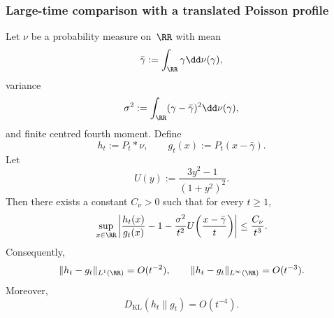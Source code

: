 \subsubsection{Large-time comparison with a translated Poisson profile}

\begin{proposition}%
\label{prop:poisson-second-order}
Let $\nu$ be a probability measure on~$\RR$ with mean
\[
\bar{\gamma}:=\int_{\RR}\gamma\dd\nu(\gamma),
\]
variance
\[
\sigma^{2}:=\int_{\RR}(\gamma-\bar{\gamma})^{2}\dd\nu(\gamma),
\]
and finite centred fourth moment.  Define
\[
h_t:=P_t*\nu,
\qquad
g_t(x):=P_t(x-\bar{\gamma}).
\]
Let
\[
U(y):=\frac{3y^{2}-1}{(1+y^{2})^{2}}.
\]
Then there exists a constant $C_\nu>0$ such that for every $t\ge 1$,
\begin{equation}\label{eq:poisson-profile}
\sup_{x\in\RR}\left|
\frac{h_t(x)}{g_t(x)}
-1
-\frac{\sigma^{2}}{t^{2}}U\!\left(\frac{x-\bar{\gamma}}{t}\right)
\right|
\le \frac{C_\nu}{t^{3}}.
\end{equation}
Consequently,
\begin{equation}\label{eq:poisson-l1-rate}
\|h_t-g_t\|_{L^{1}(\RR)}=O(t^{-2}),
\qquad
\|h_t-g_t\|_{L^\infty(\RR)}=O(t^{-3}).
\end{equation}
Moreover,
\begin{equation}\label{eq:poisson-kl-rate}
D_{\mathrm{KL}}(h_t\|g_t)=O(t^{-4}).
\end{equation}
\end{proposition}


